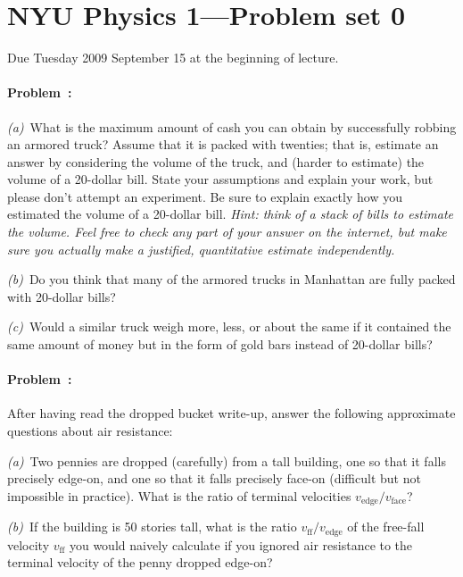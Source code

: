 \documentclass[12pt]{article}
\begin{document}
\thispagestyle{empty}

\section*{NYU Physics 1---Problem set 0}

Due Tuesday 2009 September 15 at the beginning of lecture.

\paragraph{Problem~\theproblem:}%
\textsl{(a)}~What is the maximum amount of cash you can obtain by
successfully robbing an armored truck?  Assume that it is packed with
twenties; that is, estimate an answer by considering the volume of the
truck, and (harder to estimate) the volume of a 20-dollar bill.  State
your assumptions and explain your work, but please don't attempt an
experiment.  Be sure to explain exactly how you estimated the volume
of a 20-dollar bill.  \emph{Hint: think of a stack of bills to
  estimate the volume.  Feel free to \emph{check} any part of your
  answer on the internet, but make sure you actually make a justified,
  quantitative estimate independently.}

\textsl{(b)}~Do you think that many of the armored trucks in Manhattan
are fully packed with 20-dollar bills?

\textsl{(c)}~Would a similar truck weigh more, less, or about the same
if it contained the same amount of money but in the form of gold bars
instead of 20-dollar bills?

\paragraph{Problem~\theproblem:}%
After having read the dropped bucket write-up, answer the following
approximate questions about air resistance:

\textsl{(a)}~Two pennies are dropped (carefully) from a tall building,
one so that it falls precisely edge-on, and one so that it falls
precisely face-on (difficult but not impossible in practice).  What is
the ratio of terminal velocities
$v_{\mathrm{edge}}/v_{\mathrm{face}}$?

\textsl{(b)}~If the building is 50 stories tall, what is the ratio
$v_{\mathrm{ff}}/v_{\mathrm{edge}}$ of the free-fall velocity
$v_{\mathrm{ff}}$ you would naively calculate if you ignored air
resistance to the terminal velocity of the penny dropped edge-on?
\end{document}
